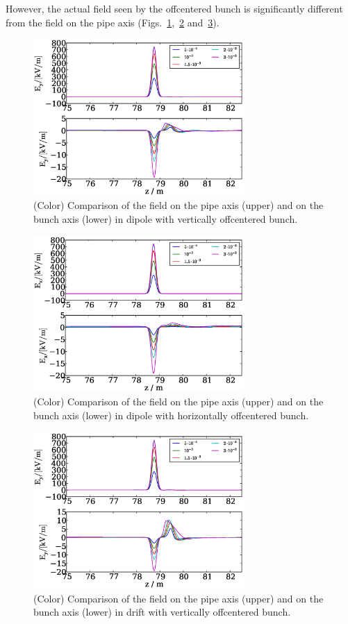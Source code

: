 \documentclass[5p]{elsarticle}%
\begin{document}
However, the actual field seen by the offcentered bunch is significantly different from the field on the pipe axis (Figs.~\ref{vs_dip_y},~\ref{vs_dip_x} and~\ref{vs_dri_y}).
\begin{figure}[htb]
\centering
\includegraphics*[width=80mm]{data/vs_dip_y.eps}
\caption{(Color) Comparison of the field on the pipe axis (upper) and on the bunch axis (lower) in dipole with vertically offcentered bunch.}
\label{vs_dip_y}
\end{figure}

\begin{figure}[htb]
\centering
\includegraphics*[width=80mm]{data/vs_dip_x.eps}
\caption{(Color) Comparison of the field on the pipe axis (upper) and on the bunch axis (lower) in dipole with horizontally offcentered bunch.}
\label{vs_dip_x}
\end{figure}

\begin{figure}[htb]
\centering
\includegraphics*[width=80mm]{data/vs_dri_y.eps}
\caption{(Color) Comparison of the field on the pipe axis (upper) and on the bunch axis (lower) in drift with vertically offcentered bunch.}
\label{vs_dri_y}
\end{figure}
\end{document}
